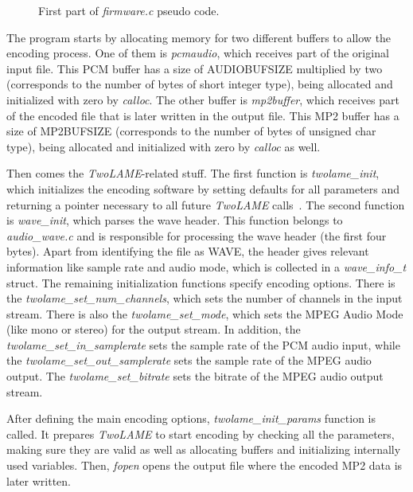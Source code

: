 \begin{figure}[H]
\centerline{}
\caption{First part of \textit{firmware.c} pseudo code.}
\label{pseudo1}
\end{figure}


The program starts by allocating memory for two different buffers to allow the encoding process. One of them is \textit{pcmaudio}, which receives part of the original input file. This PCM buffer has a size of AUDIOBUFSIZE multiplied by two (corresponds to the number of bytes of short integer type), being allocated and initialized with zero by \textit{calloc}. The other buffer is \textit{mp2buffer}, which receives part of the encoded file that is later written in the output file. This MP2 buffer has a size of MP2BUFSIZE (corresponds to the number of bytes of unsigned char type), being allocated and initialized with zero by \textit{calloc} as well.

Then comes the \textit{TwoLAME}-related stuff. The first function is \textit{twolame\_init}, which initializes the encoding software by setting defaults for all parameters and returning a pointer necessary to all future \textit{TwoLAME} calls~\cite{bib:twolameapi}. The second function is \textit{wave\_init}, which parses the wave header. This function belongs to \textit{audio\_wave.c} and is responsible for processing the wave header (the first four bytes). Apart from identifying the file as WAVE, the header gives relevant information like sample rate and audio mode, which is collected in a \textit{wave\_info\_t} struct.
The remaining initialization functions specify encoding options. There is the \textit{twolame\_set\_num\_channels}, which sets the number of channels in the input stream. There is also the \textit{twolame\_set\_mode}, which sets the MPEG Audio Mode (like mono or stereo) for the output stream. In addition, the \textit{twolame\_set\_in\_samplerate} sets the sample rate of the PCM audio input, while the \textit{twolame\_set\_out\_samplerate} sets the sample rate of the MPEG audio output. The \textit{twolame\_set\_bitrate} sets the bitrate of the MPEG audio output stream.

After defining the main encoding options, \textit{twolame\_init\_params} function is called. It prepares \textit{TwoLAME} to start encoding by checking all the parameters, making sure they are valid as well as allocating buffers and initializing internally used variables. Then, \textit{fopen} opens the output file where the encoded MP2 data is later written.

